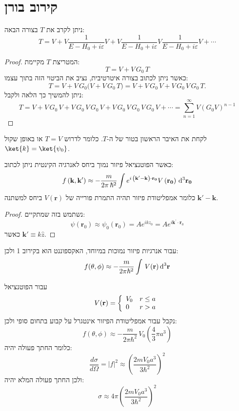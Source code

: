 \documentclass{tstextbook}
\begin{document}
\section{קירוב בורן}

\begin{proposition}
ניתן לקרב את \(T\) בצורה הבאה:
$$T=V+V{\frac{1}{E-H_{0}+i\varepsilon}}V+V{\frac{1}{E-H_{0}+i\varepsilon}}V{\frac{1}{E-H_{0}+i\varepsilon}}V+\cdots$$

\end{proposition}
\begin{proof}
המטריצת \(T\) מקיימת:
$$T=V+V\,G_{0}\,T$$
כאשר ניתן לכתוב בצורה איטרטיבית, נציב את הביטוי הזה בתוך עצמו:
$$T=V+V\,G_{0}\Big(V+V\,G_{0}\,T\Big)=V+V\,G_{0}\,V+V\,G_{0}\,V\,G_{0}\,T.$$
ניתן להמשיך כך הלאה ולקבל:
$$T=V+V\,G_{0}\,V+V\,G_{0}\,V\,G_{0}\,V+V\,G_{0}\,V\,G_{0}\,V\,G_{0}\,V+\cdots=\sum_{n=1}^{\infty}V(G_{0}V)^{n-1}$$

\end{proof}
\begin{definition}
לקחת את האיבר הראשון בטור של ה-\(T\). כלומר לדרוש \(T=V\) או באופן שקול \(\ket{k}=\ket{\psi_{0}}\). 

\end{definition}
\begin{proposition}
כאשר הפוטנציאל פיזור נמוך ביחס לאנרגיה הקינטית ניתן לכתוב:
$$f\left( \mathbf{k},\mathbf{k'} \right)\approx-\frac{m}{2\pi\,\hbar^{2}}\int e^{i\,\left( {\bf k^{\prime}-k} \right)\cdot{\bf r_{0}}}V\left( {\bf r_{0}} \right)\,\mathrm{d}^3{\bf r_{0}}$$
כלומר אמפליטודת פיזור תהיה התמרת פורייה של \(V\left( \mathbf{r} \right)\) ביחס למשתנה \(\mathbf{k'-k}\).

\end{proposition}
\begin{proof}
נשתמש בזה שמתקיים:
$$\psi(\mathbf{r}_{0})\approx\psi_{0}(\mathbf{r}_{0})=A e^{i k z_{0}}=A e^{i\mathbf{k^{\prime}}\cdot\mathbf{r}_{0}}$$
כאשר \(\mathbf{k}'\equiv k\hat{z}\). 

\end{proof}
\begin{corollary}
עבור אנרגיות פיזור נמוכות במיוחד, האקספוננט הוא בקירוב 1 ולכן:
$$f(\theta,\phi)\approx-\frac{m}{2\pi\hbar^{2}}\int\,V({\bf r})\,\mathrm{d}^3{\bf r}$$

\end{corollary}
\begin{example}
עבור הפוטנציאל
$$V({\bf r})=\left\{\begin{array}{l l}{{V_{0}}}&{{r\leq a}}\\ {{0}}&{{r>a}}\end{array}\right.$$
נקבל עבור אמפליטודת הפיזור אינטגרל על קבוע בתחום סופי ולכן:
$$f(\theta,\phi)\approx-\frac{m}{2\pi\hbar^{2}}\,V_{0}\left(\frac{4}{3}\pi a^{3}\right)$$
כלומר החתך פעולה יהיה:
$$\frac{d\sigma}{d\Omega}=|f|^{2}\approx\left(\frac{2m V_{0}a^{3}}{3\hbar^{2}}\right)^{2}$$
ולכן החתך פעולה המלא יהיה:
$$\sigma\approx4\pi\left(\frac{2m V_{0}a^{3}}{3\hbar^{2}}\right)^{2}$$

\end{example}
\end{document}
